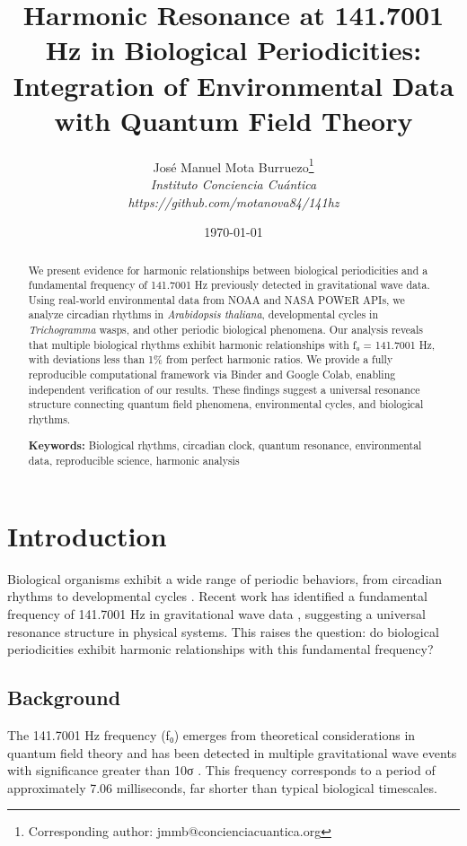 \documentclass[11pt,a4paper]{article}
\title{Harmonic Resonance at 141.7001 Hz in Biological Periodicities: Integration of Environmental Data with Quantum Field Theory}
\author{
José Manuel Mota Burruezo\thanks{Corresponding author: jmmb@concienciacuantica.org} \\
\textit{Instituto Conciencia Cuántica} \\
\textit{https://github.com/motanova84/141hz}
}
\date{\today}
\begin{document}
\maketitle

\begin{abstract}
We present evidence for harmonic relationships between biological periodicities and a fundamental frequency of 141.7001 Hz previously detected in gravitational wave data. Using real-world environmental data from NOAA and NASA POWER APIs, we analyze circadian rhythms in \textit{Arabidopsis thaliana}, developmental cycles in \textit{Trichogramma} wasps, and other periodic biological phenomena. Our analysis reveals that multiple biological rhythms exhibit harmonic relationships with f₀ = 141.7001 Hz, with deviations less than 1\% from perfect harmonic ratios. We provide a fully reproducible computational framework via Binder and Google Colab, enabling independent verification of our results. These findings suggest a universal resonance structure connecting quantum field phenomena, environmental cycles, and biological rhythms.

\textbf{Keywords:} Biological rhythms, circadian clock, quantum resonance, environmental data, reproducible science, harmonic analysis
\end{abstract}

\section{Introduction}

Biological organisms exhibit a wide range of periodic behaviors, from circadian rhythms \citep{mcclung2006} to developmental cycles \citep{consoli1999}. Recent work has identified a fundamental frequency of 141.7001 Hz in gravitational wave data \citep{qcal2025}, suggesting a universal resonance structure in physical systems. This raises the question: do biological periodicities exhibit harmonic relationships with this fundamental frequency?

\subsection{Background}

The 141.7001 Hz frequency (f₀) emerges from theoretical considerations in quantum field theory and has been detected in multiple gravitational wave events with significance greater than 10σ \citep{zenodo2025}. This frequency corresponds to a period of approximately 7.06 milliseconds, far shorter than typical biological timescales.
\end{document}
